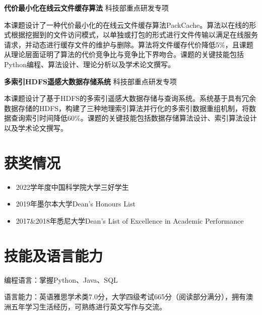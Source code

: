 \documentclass[letterpaper,11pt]{article}
\begin{document}
\textbf{代价最小化在线云文件缓存算法} \hfill 科技部重点研发专项

\vspace{2pt}

本课题设计了一种代价最小化的在线云文件缓存算法PackCache。算法以在线的形式根据挖掘到的文件访问模式，以单独或打包的形式进行文件传输以满足在线服务请求，并动态进行缓存文件的维护与删除。算法将文件缓存代价降低5\%，且课题从理论层面证明了算法的代价竞争比与竞争比下界吻合。课题的关键技能包括Python编程、算法设计、理论分析以及学术论文撰写。

\vspace{9pt}

\textbf{多索引HDFS遥感大数据存储系统} \hfill 科技部重点研发专项

\vspace{2pt}

本课题设计了基于HDFS的多索引遥感大数据存储与查询系统。系统基于具有冗余数据存储的HDFS，构建了三种地理索引算法并行化的多索引数据重组机制，将数据查询索引时间降低60\%。课题的关键技能包括数据存储算法设计、索引算法设计以及学术论文撰写。

\vspace{1pt}




\section{获奖情况}
\begin{itemize}
  \item 2022学年度中国科学院大学三好学生
  \item 2019年墨尔本大学Dean's Honours List
  \item 2017\&2018年悉尼大学Dean's List of Excellence in Academic Performance
\end{itemize}

\vspace{1pt}




\section{技能及语言能力}

编程语言：掌握Python、Java、SQL

语言能力：英语雅思学术类7.0分，大学四级考试665分（阅读部分满分），拥有澳洲五年学习生活经历，可熟练进行英文写作与交流。
\end{document}
